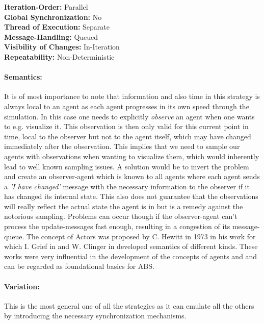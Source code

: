 \textbf{Iteration-Order:} Parallel \\
\textbf{Global Synchronization:} No \\
\textbf{Thread of Execution:} Separate \\
\textbf{Message-Handling:} Queued \\
\textbf{Visibility of Changes:}	In-Iteration \\
\textbf{Repeatability:}	Non-Deterministic 

\paragraph{Semantics:} It is of most importance to note that information and also time in this strategy is always local to an agent as each agent progresses in its own speed through the simulation. In this case one needs to explicitly \textit{observe} an agent when one wants to e.g. visualize it. This observation is then only valid for this current point in time, local to the observer but not to the agent itself, which may have changed immediately after the observation. This implies that we need to sample our agents with observations when wanting to visualize them, which would inherently lead to well known sampling issues. A solution would be to invert the problem and create an observer-agent which is known to all agents where each agent sends a \textit{'I have changed'} message with the necessary information to the observer if it has changed its internal state. This also does not guarantee that the observations will really reflect the actual state the agent is in but is a remedy against the notorious sampling. Problems can occur though if the observer-agent can't process the update-messages fast enough, resulting in a congestion of its message-queue. 
The concept of Actors was proposed by C. Hewitt in 1973 in his work \cite{hewitt_universal_1973} for which I. Grief in \cite{grief_semantics_1975} and W. Clinger in \cite{clinger_foundations_1981} developed semantics of different kinds. These works were very influential in the development of the concepts of agents and and can be regarded as foundational basics for ABS.

\paragraph{Variation:} This is the most general one of all the strategies as it can emulate all the others by introducing the necessary synchronization mechanisms.


